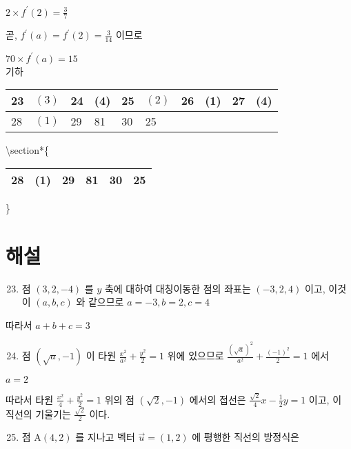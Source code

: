 \documentclass[10pt]{article}
\begin{document}
\(2 \times f^{\prime}(2)=\frac{3}{7}\)

곧, \(f^{\prime}(a)=f^{\prime}(2)=\frac{3}{14}\) 이므로

\(70 \times f^{\prime}(a)=15\)\\
기하

\begin{center}
\begin{tabular}{|l|l|l|l|l|l|l|l|l|l|}
\hline
23 & \((3)\) & 24 & (4) & 25 & \((2)\) & 26 & (1) & 27 & (4) \\
\hline
28 & \((1)\) & 29 & 81 & 30 & 25 &  &  &  &  \\
\hline
\end{tabular}
\end{center}

\textbackslash section*\{\begin{tabular}{llllll}
28 & (1) & 29 & 81 & 30 & 25 \\
\hline
\end{tabular}\}

\section*{해설}
\begin{enumerate}
  \setcounter{enumi}{22}
  \item 점 \((3,2,-4)\) 를 \(y\) 축에 대하여 대칭이동한 점의 좌표는 \((-3,2,4)\) 이고, 이것이 \((a, b, c)\) 와 같으므로 \(a=-3, b=2, c=4\)
\end{enumerate}

따라서 \(a+b+c=3\)

\begin{enumerate}
  \setcounter{enumi}{23}
  \item 점 \((\sqrt{a},-1)\) 이 타원 \(\frac{x^{2}}{a^{2}}+\frac{y^{2}}{2}=1\) 위에 있으므로 \(\frac{(\sqrt{a})^{2}}{a^{2}}+\frac{(-1)^{2}}{2}=1\) 에서
\end{enumerate}

\(a=2\)

따라서 타원 \(\frac{x^{2}}{4}+\frac{y^{2}}{2}=1\) 위의 점 \((\sqrt{2},-1)\) 에서의 접선은 \(\frac{\sqrt{2}}{4} x-\frac{1}{2} y=1\) 이고, 이 직선의 기울기는 \(\frac{\sqrt{2}}{2}\) 이다.

\begin{enumerate}
  \setcounter{enumi}{24}
  \item 점 \(\mathrm{A}(4,2)\) 를 지나고 벡터 \(\vec{u}=(1,2)\) 에 평행한 직선의 방정식은
\end{enumerate}
\end{document}
